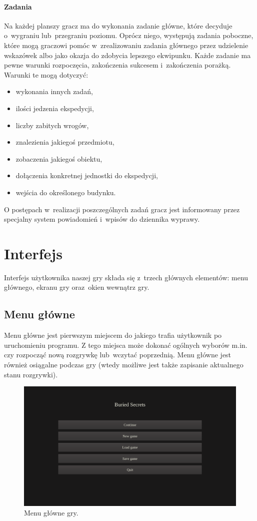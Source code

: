 \documentclass[licencjacka]{pracamgr}
\begin{document}
      \paragraph{Zadania}
	Na każdej planszy gracz ma do wykonania zadanie główne, które decyduje o~wygraniu lub~przegraniu poziomu. Oprócz niego,
	występują zadania poboczne, które mogą graczowi pomóc w~zrealizowaniu zadania głównego przez udzielenie wskazówek albo jako okazja do zdobycia lepszego
	ekwipunku. Każde zadanie ma pewne warunki rozpoczęcia, zakończenia sukcesem i~zakończenia porażką. Warunki te mogą dotyczyć:
	\begin{itemize}
	 \item wykonania innych zadań,
	 \item ilości jedzenia ekspedycji,
	 \item liczby zabitych wrogów,
	 \item znalezienia jakiegoś przedmiotu,
	 \item zobaczenia jakiegoś obiektu,
	 \item dołączenia konkretnej jednostki do ekspedycji,
	 \item wejścia do określonego budynku.
	\end{itemize}
	O postępach w~realizacji poszczególnych zadań gracz jest informowany przez specjalny system powiadomień i~wpisów do dziennika wyprawy.


  \section{Interfejs}
    Interfejs użytkownika naszej gry składa się z~trzech głównych elementów: menu głównego, ekranu gry oraz~okien wewnątrz gry.

    \subsection{Menu główne}
      Menu główne jest pierwszym miejscem do jakiego trafia użytkownik po uruchomieniu programu. Z tego miejsca może dokonać ogólnych wyborów m.in. czy
      rozpocząć nową rozgrywkę lub~wczytać poprzednią. Menu główne jest również osiągalne podczas gry (wtedy możliwe jest także zapisanie aktualnego stanu rozgrywki).

      \begin{figure}[htbp]
	\centering
	\includegraphics[scale=0.22]{MainMenu.png}
	\caption{Menu główne gry.}
      \end{figure}
\end{document}
